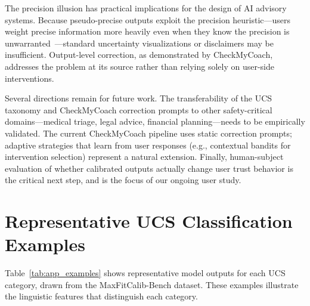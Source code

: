 \documentclass[manuscript, review, anonymous]{acmart}
\begin{document}
The precision illusion has practical implications for the design of AI advisory systems. Because pseudo-precise outputs exploit the precision heuristic---users weight precise information more heavily even when they know the precision is unwarranted~\cite{zhang2012precision, jerez2014precision}---standard uncertainty visualizations or disclaimers may be insufficient. Output-level correction, as demonstrated by CheckMyCoach, addresses the problem at its source rather than relying solely on user-side interventions.

Several directions remain for future work. The transferability of the UCS taxonomy and CheckMyCoach correction prompts to other safety-critical domains---medical triage, legal advice, financial planning---needs to be empirically validated. The current CheckMyCoach pipeline uses static correction prompts; adaptive strategies that learn from user responses (e.g., contextual bandits for intervention selection) represent a natural extension. Finally, human-subject evaluation of whether calibrated outputs actually change user trust behavior is the critical next step, and is the focus of our ongoing user study.




\appendix

\section{Representative UCS Classification Examples}
\label{app:ucs_examples}

Table~\ref{tab:app_examples} shows representative model outputs for each UCS category, drawn from the MaxFitCalib-Bench dataset. These examples illustrate the linguistic features that distinguish each category.
\end{document}
